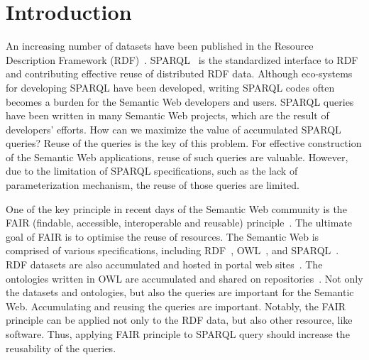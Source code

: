 \documentclass[runningheads]{llncs}
\begin{document}
\section{Introduction}

An increasing number of datasets have been published in the Resource Description Framework (RDF)~\cite{rdf}.
SPARQL~\cite{sparql} is the standardized interface to RDF and contributing effective reuse of distributed RDF data. 
Although eco-systems for developing SPARQL have been developed, writing SPARQL codes often becomes a burden for the Semantic Web developers and users. 
SPARQL queries have been written in many Semantic Web projects, which are the result of developers' efforts. 
How can we maximize the value of accumulated SPARQL queries?
Reuse of the queries is the key of this problem.
For effective construction of the Semantic Web applications, reuse of such queries are valuable.
However, due to the limitation of SPARQL specifications, such as the lack of parameterization mechanism, the reuse of those queries are limited. 


One of the key principle in recent days of the Semantic Web community is the FAIR (findable, accessible, interoperable and reusable) principle~\cite{fair}.
The ultimate goal of FAIR is to optimise the reuse of resources. 
The Semantic Web is comprised of various specifications, including RDF~\cite{rdf}, OWL~\cite{owl}, and SPARQL~\cite{sparql}. 
RDF datasets are also accumulated and hosted in portal web sites~\cite{rdf-portal}.
The ontologies written in OWL are accumulated and shared on repositories~\cite{bioportal}.
Not only the datasets and ontologies, but also the queries are important for the Semantic Web.
Accumulating and reusing the queries are important.
Notably, the FAIR principle can be applied not only to the RDF data, but also other resource, like software.
Thus, applying FAIR principle to SPARQL query should increase the reusability of the queries.
\end{document}
